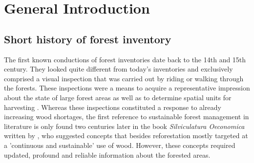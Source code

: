 	

	

	
\chapter{General Introduction}
\label{chap:intro}
\newpage
\section{Short history of forest inventory}
\label{sec:intro:hist_soa}

The first known conductions of forest inventories date back to the 14th and 15th century. They looked quite different from today's inventories and exclusively comprised a visual inspection that was carried out by riding or walking through the forests. These inspections were a means to acquire a representative impression about the state of large forest areas as well as to determine spatial units for harvesting \citep{zoehrer1980}. Whereas these inspections constituted a response to already increasing wood shortages, the first reference to sustainable forest management in literature is only found two centuries later in the book \textit{Silviculatura Oeconomica} written by \citet{carlowitz1713}, who suggested concepts that besides reforestation mostly targeted at a 'continuous and sustainable' use of wood. However, these concepts required updated, profound and reliable information about the forested areas.\par

